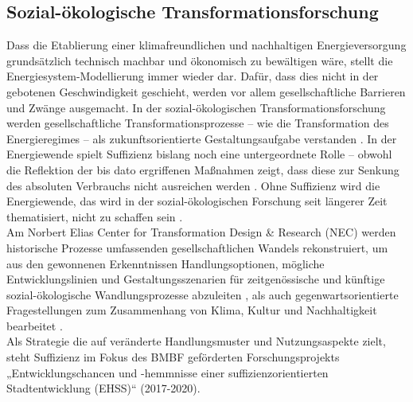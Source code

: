 \documentclass[a4paper,11pt,twoside]{scrartcl}
\begin{document}
\subsection*{Sozial-ökologische Transformationsforschung}

Dass die Etablierung einer klimafreundlichen und nachhaltigen Energieversorgung grundsätzlich technisch machbar und ökonomisch zu bewältigen wäre, stellt die Energiesystem-Modellierung immer wieder dar. Dafür, dass dies nicht in der gebotenen Geschwindigkeit geschieht, werden vor allem gesellschaftliche Barrieren und Zwänge ausgemacht.
In der sozial-ökologischen Transformationsforschung werden gesellschaftliche Transformationsprozesse -- wie die Transformation des Energieregimes -- als zukunftsorientierte Gestaltungsaufgabe verstanden \cite{Sommer2016}. In der Energiewende spielt Suffizienz bislang noch eine untergeordnete Rolle – obwohl die Reflektion der bis dato ergriffenen Maßnahmen zeigt, dass diese zur Senkung des absoluten Verbrauchs nicht ausreichen werden \cite{Brischke2016}. Ohne Suffizienz wird die Energiewende, das wird in der sozial-ökologischen Forschung seit längerer Zeit thematisiert, nicht zu schaffen sein \cite{Huber1995,Fischer2013,Schneidewind2013}.\\
Am Norbert Elias Center for Transformation Design & Research (NEC) werden historische Prozesse umfassenden gesellschaftlichen Wandels rekonstruiert, um aus den gewonnenen Erkenntnissen Handlungsoptionen, mögliche Entwicklungslinien und Gestaltungsszenarien für zeitgenössische und künftige sozial-ökologische Wandlungsprozesse abzuleiten \cite{Christ2015,Christ2016}, als auch gegenwartsorientierte Fragestellungen zum Zusammenhang von Klima, Kultur und Nachhaltigkeit bearbeitet \cite{Sommer2011,Sommer2015,Stumpf2015}.\\
Als Strategie die auf veränderte Handlungsmuster und Nutzungsaspekte zielt, steht Suffizienz im Fokus des BMBF geförderten Forschungsprojekts „Entwicklungschancen und -hemmnisse einer suffizienzorientierten Stadtentwicklung (EHSS)“ (2017-2020).
\end{document}
